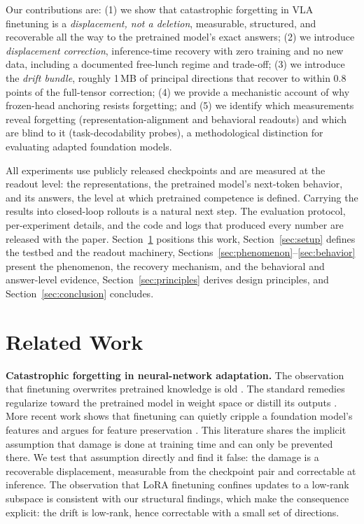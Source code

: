 \documentclass{article}
\begin{document}
Our contributions are: (1) we show that catastrophic forgetting in VLA
finetuning is a \emph{displacement, not a deletion}, measurable, structured, and recoverable
all the way to the pretrained model's exact answers; (2) we introduce \emph{displacement
correction}, inference-time recovery with zero training and no new data, including a documented
free-lunch regime and trade-off; (3) we introduce the \emph{drift bundle}, roughly 1\,MB of
principal directions that recover to within $0.8$ points of the full-tensor correction; (4) we provide a
mechanistic account of why frozen-head anchoring resists forgetting; and (5) we identify which
measurements reveal forgetting (representation-alignment and behavioral readouts) and which are
blind to it (task-decodability probes), a methodological distinction for evaluating adapted
foundation models.

All experiments use publicly released checkpoints and are measured at the readout level: the
representations, the pretrained model's next-token behavior, and its answers, the level at
which pretrained competence is defined. Carrying the results into closed-loop rollouts is a
natural next step. The evaluation protocol, per-experiment details, and the code and logs that
produced every number are released with the paper. Section~\ref{sec:related} positions this
work, Section~\ref{sec:setup} defines the testbed and the readout machinery,
Sections~\ref{sec:phenomenon}--\ref{sec:behavior} present the phenomenon, the recovery
mechanism, and the behavioral and answer-level evidence, Section~\ref{sec:principles} derives
design principles, and Section~\ref{sec:conclusion} concludes.

\section{Related Work}
\label{sec:related}

\textbf{Catastrophic forgetting in neural-network adaptation.} The observation that
finetuning overwrites pretrained knowledge is old \cite{kirkpatrick2017ewc,li2018lwf}.
The standard remedies regularize toward the pretrained model in weight space
\cite{kirkpatrick2017ewc,li2018lwf,douillard2020podnet} or distill its outputs
\cite{hinton2015distill,romero2015fitnets}. More recent work shows that finetuning can
quietly cripple a foundation model's features and argues for feature preservation
\cite{mukhoti2024finetuning}. This literature shares the implicit assumption that damage is
done at training time and can only be prevented there. We test that assumption directly and
find it false: the damage is a recoverable displacement, measurable from the checkpoint
pair and correctable at inference. The
observation that LoRA finetuning confines updates to a low-rank subspace
\cite{hu2022lora} is consistent with our structural findings, which make the consequence
explicit: the drift is low-rank, hence correctable with a small set of directions.
\end{document}
